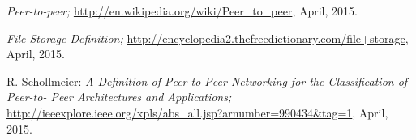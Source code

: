 \begin{thebibliography}{99}
		\emph{Peer-to-peer;}
		\url{http://en.wikipedia.org/wiki/Peer_to_peer},
		April, 2015.
		
		\emph{File Storage Definition;}
		\url{http://encyclopedia2.thefreedictionary.com/file+storage},
		April, 2015.
		
		R. Schollmeier:
		\emph{A Definition of Peer-to-Peer Networking for the Classification of Peer-to- Peer Architectures and Applications;}
		\url{http://ieeexplore.ieee.org/xpls/abs_all.jsp?arnumber=990434&tag=1},
		April, 2015.
		
\end{thebibliography}